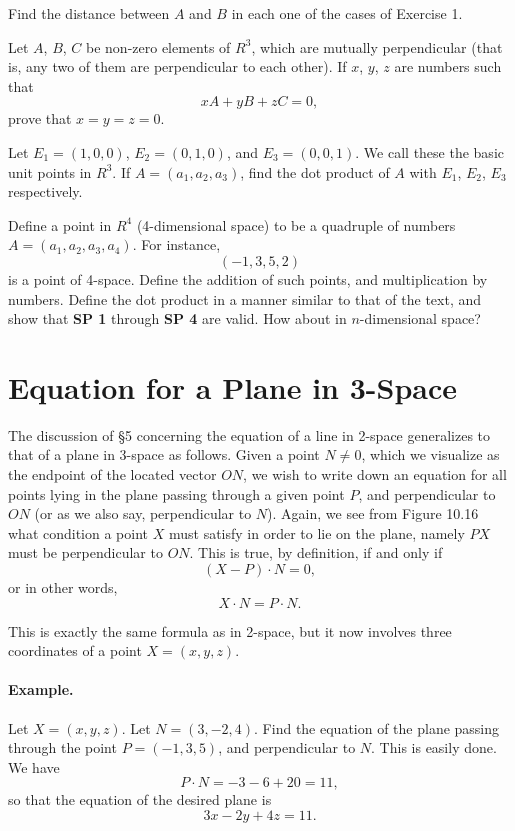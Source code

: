 \documentclass[12pt]{book} %
\begin{document}
\begin{ExerciseList}
\begin{ExerciseList}
\Exercise Find the distance between $A$ and $B$ in each one of the cases of Exercise 1.

\Exercise Let $A$, $B$, $C$ be non-zero elements of $R^3$, which are mutually perpendicular (that is, any two of them are perpendicular to each other). If $x$, $y$, $z$ are numbers such that
\[
xA+yB+zC=0,
\]
prove that $x=y=z=0$.

\Exercise Let $E_1=(1,0,0)$, $E_2=(0,1,0)$, and $E_3=(0,0,1)$. We call these the basic unit points in $R^3$. If $A=(a_1,a_2,a_3)$, find the dot product of $A$ with $E_1$, $E_2$, $E_3$ respectively.

\Exercise Define a point in $R^4$ (4-dimensional space) to be a quadruple of numbers $A=(a_1,a_2,a_3,a_4)$. For instance,
\[
(-1,3,5,2)
\]
is a point of 4-space. Define the addition of such points, and multiplication by numbers. Define the dot product in a manner similar to that of the text, and show that \textbf{SP 1} through \textbf{SP 4} are valid. How about in $n$-dimensional space?
\end{ExerciseList}

\section{Equation for a Plane in 3-Space}

The discussion of \S5 concerning the equation of a line in 2-space generalizes to that of a plane in 3-space as follows. Given a point $N\ne 0$, which we visualize as the endpoint of the located vector $ON$, we wish to write down an equation for all points lying in the plane passing through a given point $P$, and perpendicular to $ON$ (or as we also say, perpendicular to $N$). Again, we see from Figure 10.16 what condition a point $X$ must satisfy in order to lie on the plane, namely $PX$ must be perpendicular to $ON$. This is true, by definition, if and only if
\[
(X-P)\cdot N=0,
\]
or in other words,
\[
X\cdot N=P\cdot N.
\]

This is exactly the same formula as in 2-space, but it now involves three coordinates of a point $X=(x,y,z)$.


\paragraph{Example.}
Let $X=(x,y,z)$. Let $N=(3,-2,4)$. Find the equation of the plane passing through the point $P=(-1,3,5)$, and perpendicular to $N$. This is easily done. We have
\[
P\cdot N=-3-6+20=11,
\]
so that the equation of the desired plane is
\[
3x-2y+4z=11.
\]


\end{ExerciseList}
\end{document}
